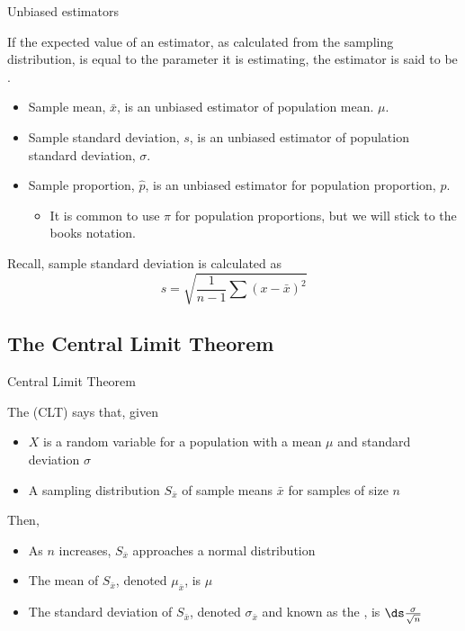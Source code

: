 \documentclass[xcolor=table, handout]{beamer}
\begin{document}
\begin{frame}{Unbiased estimators}
\begin{block}{}
{\large If the expected value of an estimator, as calculated from the sampling distribution, is equal to the parameter it is estimating, the estimator is said to be . }
\begin{itemize}
\pause\item Sample mean, $\bar x$, is an unbiased estimator of population mean. $\mu$.
\pause\item Sample standard deviation, $s$, is an unbiased estimator of population standard deviation, $\sigma$.
\pause\item Sample proportion, $\hat p$, is an unbiased estimator for population proportion, $p$.
\begin{itemize}
\item It is common to use $\pi$ for population proportions, but we will stick to the books notation. 
\end{itemize}
\end{itemize}
\end{block}

\pause
\begin{alertblock}{}
Recall, sample standard deviation is calculated as 
\[s = \sqrt{\frac 1 {n-1} \sum (x - \bar x)^2}\]
\end{alertblock}
\end{frame}

\subsection{The Central Limit Theorem}

\begin{frame}{Central Limit Theorem}
\begin{block}{}
The  (CLT) says that, given
\begin{itemize}
\pause\item $X$ is a random variable for a population with a mean $\mu$ and standard deviation $\sigma$
\pause\item A sampling distribution $S_{\bar x}$ of sample means $\bar x$ for samples of size $n$
\end{itemize}
\pause Then,
\begin{itemize}
\item As $n$ increases, $S_{\bar x}$ approaches a normal distribution
\pause\item The mean of $S_{\bar x}$, denoted $\mu_{\bar x}$, is $\mu$
\pause\item The standard deviation of $S_{\bar x}$, denoted $\sigma_{\bar x}$ and known as the , is $\ds \frac \sigma {\sqrt n}$  
\end{itemize}
\end{block}
\end{frame}
\end{document}

